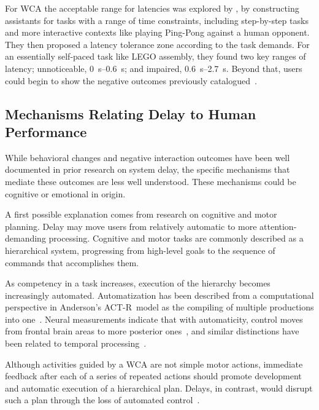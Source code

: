 \documentclass[10pt,letterpaper]{article}
\providecommand{\DIFaddtex}[1]{#1} %
\providecommand{\DIFdeltex}[1]{} %
\providecommand{\DIFaddbegin}{\protect\color{blue}} %
\providecommand{\DIFaddend}{\protect\color{black}} %
\providecommand{\DIFdelbegin}{\protect\color{red}} %
\providecommand{\DIFdelend}{\protect\color{black}} %
\providecommand{\DIFadd}[1]{\texorpdfstring{\DIFaddtex{#1}}{#1}} %
\providecommand{\DIFdel}[1]{\texorpdfstring{\DIFdeltex{#1}}{}} %
\newcommand{\DIFscaledelfig}{0.5}
\newlength{\DIFdelgraphicswidth} %
\newlength{\DIFdelgraphicsheight} %
\newcommand{\DIFaddincludegraphics}[2][]{{\color{blue}\fbox{\DIFOincludegraphics[#1]{#2}}}} %
\newcommand{\DIFdelincludegraphics}[2][]{%
\sbox{\DIFdelgraphicsbox}{\DIFOincludegraphics[#1]{#2}}%
\settoboxwidth{\DIFdelgraphicswidth}{\DIFdelgraphicsbox} %
\settoboxtotalheight{\DIFdelgraphicsheight}{\DIFdelgraphicsbox} %
\scalebox{\DIFscaledelfig}{%
\parbox[b]{\DIFdelgraphicswidth}{\usebox{\DIFdelgraphicsbox}\\[-\baselineskip] \rule{\DIFdelgraphicswidth}{0em}}\llap{\resizebox{\DIFdelgraphicswidth}{\DIFdelgraphicsheight}{%
\setlength{\unitlength}{\DIFdelgraphicswidth}%
\begin{picture}(1,1)%
\thicklines\linethickness{2pt} %
{\color[rgb]{1,0,0}\put(0,0){\framebox(1,1){}}}%
{\color[rgb]{1,0,0}\put(0,0){\line( 1,1){1}}}%
{\color[rgb]{1,0,0}\put(0,1){\line(1,-1){1}}}%
\end{picture}%
}\hspace*{3pt}}} %
} %
\DeclareRobustCommand{\DIFaddbegin}{\DIFOaddbegin \let\includegraphics\DIFaddincludegraphics} %
\DeclareRobustCommand{\DIFaddend}{\DIFOaddend \let\includegraphics\DIFOincludegraphics} %
\DeclareRobustCommand{\DIFdelbegin}{\DIFOdelbegin \let\includegraphics\DIFdelincludegraphics} %
\DeclareRobustCommand{\DIFdelend}{\DIFOaddend \let\includegraphics\DIFOincludegraphics} %
\begin{document}
For WCA the acceptable range for latencies was explored by \textcite{Chen:AnEmpiricalStudyOfLatency}, by constructing assistants for tasks with a range of time constraints, including step-by-step tasks and more interactive contexts like playing Ping-Pong against a human opponent.
They then proposed a latency tolerance zone according to the task demands.
For an essentially self-paced task like LEGO assembly, they found two key ranges of latency; unnoticeable, \SIrange{0}{0.6}{\second}; and impaired, \SIrange{0.6}{2.7}{\second}. 
Beyond that, users could begin to show the negative outcomes previously catalogued~\autocite{dabrowsky:2011:40years}.


\subsection{\DIFdelbegin \DIFdel{Potential }\DIFdelend Mechanisms Relating Delay to Human Performance}\label{ssec:potentialmechs}

While behavioral changes and negative interaction outcomes have been well documented in prior research on system delay, the specific mechanisms that mediate these outcomes are less well understood. 
These mechanisms could be cognitive or emotional in origin.

\DIFdelbegin \DIFdel{Research }\DIFdelend \DIFaddbegin \DIFadd{A first possible explanation comes from research }\DIFaddend on cognitive and motor planning\DIFdelbegin \DIFdel{suggests that delay }\DIFdelend \DIFaddbegin \DIFadd{. 
Delay }\DIFaddend may move users from relatively automatic to more attention-demanding processing.
Cognitive and motor tasks are commonly described as a hierarchical system, progressing from high-level goals to the sequence of commands that accomplishes them.
\DIFdelbegin %

\DIFdelend As competency in a task increases, execution of the hierarchy becomes increasingly automated.
Automatization has been described from a computational perspective in {Anderson's ACT-R}~model as the compiling of multiple productions into one~\autocite{neves1981knowledge}.
Neural measurements indicate that with automaticity, control moves from frontal brain areas to more posterior ones~\autocite{jeon2015degree,puttemans2005changes}, and similar distinctions have been related to temporal processing~\autocite{lewis2003distinct,koch2009neural,lee2019limiting}.

Although activities guided by a WCA are not simple motor actions, immediate feedback after each of a series of repeated actions should promote development and automatic execution of a hierarchical plan.
Delays, in contrast, would disrupt such a plan through the loss of automated control~\autocite{lee2019limiting}.
\end{document}
